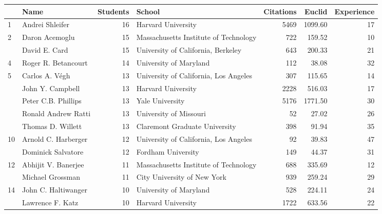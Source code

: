 \begin{tabular}{lp{3cm}r|lrrr}
\toprule
   &                   Name &  Students &                                School &  Citations &  Euclid &  Experience \\
\midrule
 1 &        Andrei Shleifer &        16 &                    Harvard University &       5469 & 1099.60 &          17 \\
 2 &         Daron Acemoglu &        15 & Massachusetts Institute of Technology &        722 &  159.52 &          10 \\
   &          David E. Card &        15 &    University of California, Berkeley &        643 &  200.33 &          21 \\
 4 &    Roger R. Betancourt &        14 &                University of Maryland &        112 &   38.08 &          32 \\
 5 &         Carlos A. Végh &        13 & University of California, Los Angeles &        307 &  115.65 &          14 \\
   &       John Y. Campbell &        13 &                    Harvard University &       2228 &  516.03 &          17 \\
   &    Peter C.B. Phillips &        13 &                       Yale University &       5176 & 1771.50 &          30 \\
   &    Ronald Andrew Ratti &        13 &                University of Missouri &         52 &   27.02 &          26 \\
   &      Thomas D. Willett &        13 &         Claremont Graduate University &        398 &   91.94 &          35 \\
10 &    Arnold C. Harberger &        12 & University of California, Los Angeles &         92 &   39.83 &          47 \\
   &     Dominick Salvatore &        12 &                    Fordham University &        149 &   44.37 &          31 \\
12 &    Abhijit V. Banerjee &        11 & Massachusetts Institute of Technology &        688 &  335.69 &          12 \\
   &       Michael Grossman &        11 &           City University of New York &        939 &  259.24 &          29 \\
14 &    John C. Haltiwanger &        10 &                University of Maryland &        528 &  224.11 &          24 \\
   &       Lawrence F. Katz &        10 &                    Harvard University &       1722 &  633.56 &          22 \\

\end{tabular}
